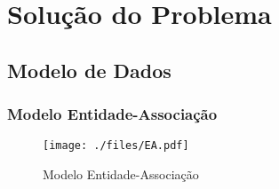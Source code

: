 %
%
\chapter{Solução do Problema} \label{cap3}

\section{Modelo de Dados}\label{sec31}

\subsection{Modelo Entidade-Associação}

\begin{figure}
	\centering
	\texttt{[image: ./files/EA.pdf]}
	\caption{Modelo Entidade-Associação}
	\label{modelo-ea}
\end{figure}

